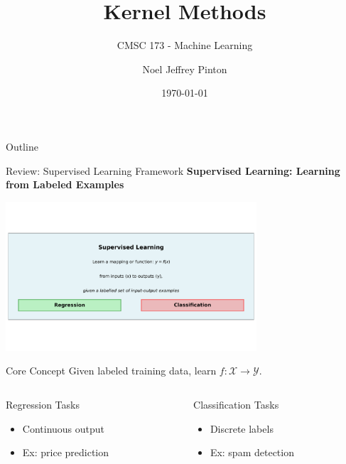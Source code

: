 \documentclass[8pt,aspectratio=1610]{beamer}
\title{Kernel Methods}
\subtitle{CMSC 173 - Machine Learning}
\author{Noel Jeffrey Pinton}
\institute{Department of Computer Science\\University of the Philippines - Cebu}
\date{\today}
\begin{document}
\begin{frame}
\titlepage
\end{frame}

\begin{frame}{Outline}
\tableofcontents
\end{frame}

\begin{frame}{Review: Supervised Learning Framework}
\centering
\textbf{Supervised Learning: Learning from Labeled Examples}

\includegraphics[width=0.7\textwidth]{../figures/supervised_learning_overview.png}

\vspace{0.1cm}
\begin{block}{Core Concept}
Given labeled training data, learn $f: \mathcal{X} \to \mathcal{Y}$.
\end{block}

\begin{columns}[t]
\begin{column}{0.48\textwidth}
\begin{block}{Regression Tasks}
\begin{itemize}
\setlength{\itemsep}{0pt}
\item Continuous output
\item Ex: price prediction
\end{itemize}
\end{block}
\end{column}

\begin{column}{0.48\textwidth}
\begin{block}{Classification Tasks}
\begin{itemize}
\setlength{\itemsep}{0pt}
\item Discrete labels
\item Ex: spam detection
\end{itemize}
\end{block}
\end{column}
\end{columns}
\end{frame}
\end{document}
